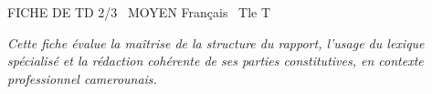 \documentclass[11pt]{article}
\begin{document}
\begin{tcolorbox}[enhanced,colback=popink,colframe=popink,arc=10pt,boxrule=0pt,left=12pt,right=12pt,top=9pt,bottom=9pt]
{\color{white}\popxbold\small FICHE DE TD 2/3 \textbullet\ MOYEN \hfill Français \textbullet\ Tle T\par}
\end{tcolorbox}
\vspace{4pt}
\noindent \textit{Cette fiche évalue la maîtrise de la structure du rapport, l'usage du lexique spécialisé et la rédaction cohérente de ses parties constitutives, en contexte professionnel camerounais.}
\end{document}
